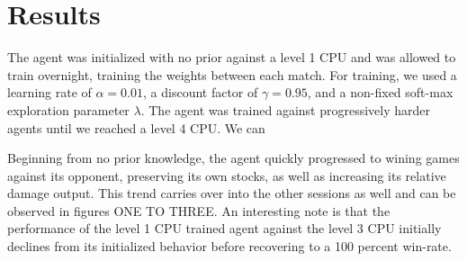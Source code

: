 \section{Results}
The agent was initialized with no prior against a level 1 CPU and was allowed to train overnight, training the weights between each match. For training, we used a learning rate of $\alpha = 0.01$, a discount factor of $\gamma = 0.95$, and a non-fixed soft-max exploration parameter $\lambda$. The agent was trained against progressively harder agents until we reached a level 4 CPU. We can 

Beginning from no prior knowledge, the agent quickly progressed to wining games against its opponent, preserving its own stocks, as well as increasing its relative damage output. This trend carries over into the other sessions as well and can be observed in figures ONE TO THREE. An interesting note is that the performance of the level 1 CPU trained agent against the level 3 CPU initially declines from its initialized behavior before recovering to a 100 percent win-rate. 

